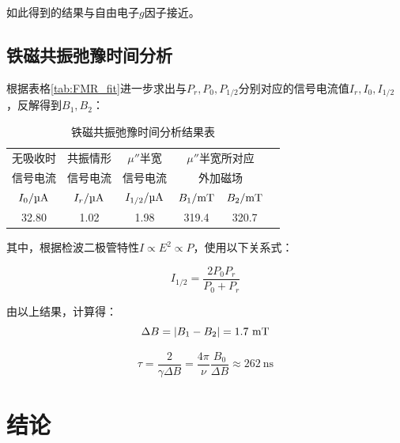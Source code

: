 \documentclass{thuemp}
\begin{document}
如此得到的结果与自由电子$g$因子接近。

\subsection{铁磁共振弛豫时间分析}

根据表格\ref{tab:FMR_fit}进一步求出与$P_r, P_0, P_{1/2}$分别对应的信号电流值$I_r, I_0, I_{1/2}$，反解得到$B_{1}, B_{2}$：

\begin{table}[H]
    \centering
    \captionnamefont{\wuhao\bf\heiti}
    \captiontitlefont{\wuhao\bf\heiti}
    \caption{铁磁共振弛豫时间分析结果表} \label{tab:FMR_relax}
    \liuhao
    \begin{tabular}{cccccc}
        \toprule
        无吸收时 & 共振情形 & $\mu''$半宽 &
            \multicolumn{2}{c}{$\mu''$半宽所对应}\\
        信号电流 & 信号电流 & 信号电流     &  
            \multicolumn{2}{c}{外加磁场}\\
        $I_{0}/\text{\si{\micro\ampere}}$ & 
            $I_{r}/\text{\si{\micro\ampere}}$ &
            $I_{1/2}/\text{\si{\micro\ampere}}$&
            $B_1/\text{\si{\milli\tesla}}$ &
            $B_2/\text{\si{\milli\tesla}}$ \\ 
        \midrule
        32.80& 1.02 & 1.98 & 319.4 & 320.7 \\
        \bottomrule
    \end{tabular}
\end{table}

其中，根据检波二极管特性$I \propto E^2 \propto P$，使用以下关系式：

\begin{equation}
    I_{1/2} = \frac{2P_0P_r}{P_0+P_r}
\end{equation}

由以上结果，计算得：
\begin{equation}
    \Delta B = |B_1 - B_2| = 1.7 ~\text{\si{\milli\tesla}}
\end{equation}

\begin{equation}
    \tau = \frac{2}{\gamma\Delta B}
         = \frac{4\pi}{\nu}\frac{B_0}{\Delta B}
         \approx 262 ~ \text{ns}
\end{equation}

\section{结论}
\end{document}
